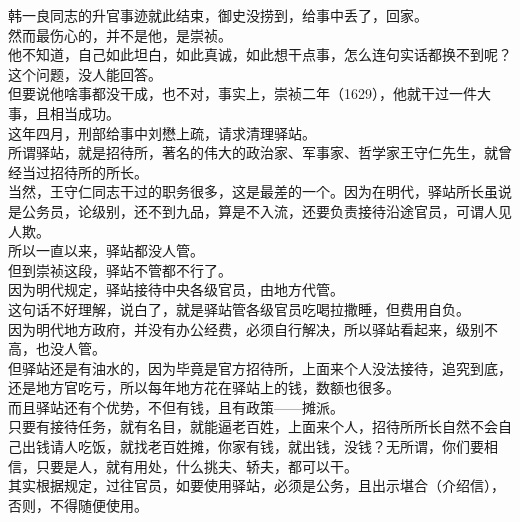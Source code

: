\begin{multicols}{\theparacolNo}
韩一良同志的升官事迹就此结束，御史没捞到，给事中丢了，回家。\\

然而最伤心的，并不是他，是崇祯。\\

他不知道，自己如此坦白，如此真诚，如此想干点事，怎么连句实话都换不到呢？\\

这个问题，没人能回答。\\

但要说他啥事都没干成，也不对，事实上，崇祯二年（1629），他就干过一件大事，且相当成功。\\

这年四月，刑部给事中刘懋上疏，请求清理驿站。\\

所谓驿站，就是招待所，著名的伟大的政治家、军事家、哲学家王守仁先生，就曾经当过招待所的所长。\\

当然，王守仁同志干过的职务很多，这是最差的一个。因为在明代，驿站所长虽说是公务员，论级别，还不到九品，算是不入流，还要负责接待沿途官员，可谓人见人欺。\\

所以一直以来，驿站都没人管。\\

但到崇祯这段，驿站不管都不行了。\\

因为明代规定，驿站接待中央各级官员，由地方代管。\\

这句话不好理解，说白了，就是驿站管各级官员吃喝拉撒睡，但费用自负。\\

因为明代地方政府，并没有办公经费，必须自行解决，所以驿站看起来，级别不高，也没人管。\\

但驿站还是有油水的，因为毕竟是官方招待所，上面来个人没法接待，追究到底，还是地方官吃亏，所以每年地方花在驿站上的钱，数额也很多。\\

而且驿站还有个优势，不但有钱，且有政策——摊派。\\

只要有接待任务，就有名目，就能逼老百姓，上面来个人，招待所所长自然不会自己出钱请人吃饭，就找老百姓摊，你家有钱，就出钱，没钱？无所谓，你们要相信，只要是人，就有用处，什么挑夫、轿夫，都可以干。\\

其实根据规定，过往官员，如要使用驿站，必须是公务，且出示堪合（介绍信），否则，不得随便使用。\\


\end{multicols}
